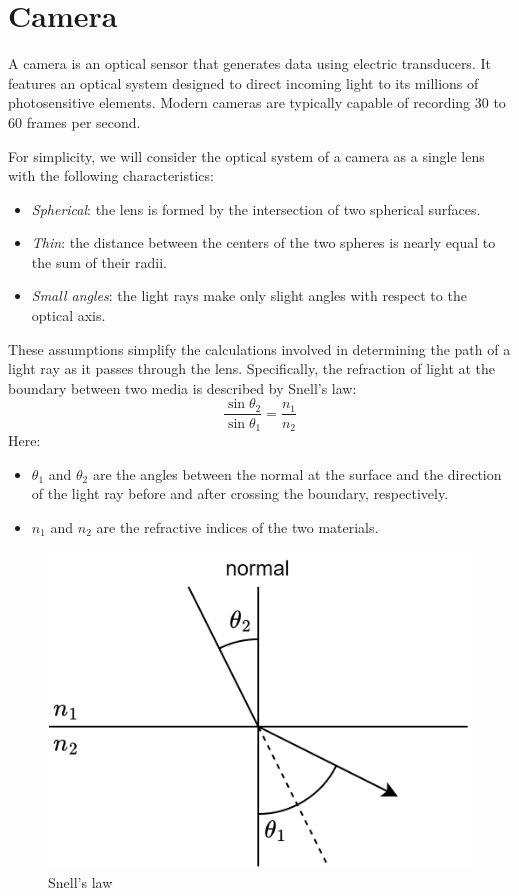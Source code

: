 \section{Camera}

\begin{definition}
    A camera is an optical sensor that generates data using electric transducers. 
    It features an optical system designed to direct incoming light to its millions of photosensitive elements. 
    Modern cameras are typically capable of recording 30 to 60 frames per second.
\end{definition}
For simplicity, we will consider the optical system of a camera as a single lens with the following characteristics:
\begin{itemize}
    \item \textit{Spherical}: the lens is formed by the intersection of two spherical surfaces.
    \item \textit{Thin}: the distance between the centers of the two spheres is nearly equal to the sum of their radii.
    \item \textit{Small angles}: the light rays make only slight angles with respect to the optical axis.
\end{itemize}
These assumptions simplify the calculations involved in determining the path of a light ray as it passes through the lens. 
Specifically, the refraction of light at the boundary between two media is described by Snell's law:
\[\dfrac{\sin{\theta_2}}{\sin{\theta_1}}=\dfrac{n_1}{n_2}\]
Here: 
\begin{itemize}
    \item $\theta_1$ and $\theta_2$ are the angles between the normal at the surface and the direction of the light ray before and after crossing the boundary, respectively.
    \item $n_1$ and $n_2$ are the refractive indices of the two materials.
\end{itemize}
\begin{figure}[H]
    \centering
    \includegraphics[width=0.4\linewidth]{images/refraction.png}
    \caption{Snell's law}
\end{figure}
